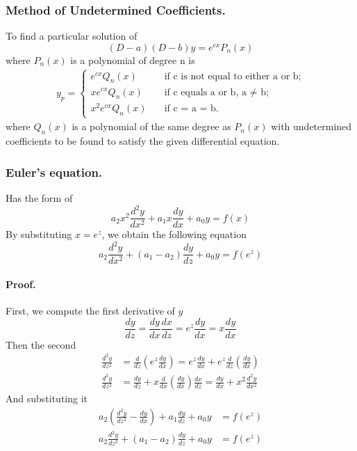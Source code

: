 \documentclass[../main.tex]{subfiles}
\begin{document}
\subsubsection*{Method of Undetermined Coefficients.} To find a particular solution of
\begin{equation*}
    (D - a)(D - b)y=e^{cx}P_n(x)
\end{equation*}
where $P_n(x)$ is a polynomial of degree n is
\begin{align*}
    y_p=
    \begin{cases}
        e^{cx}Q_n(x) \quad    & \text{if c is not equal to either a or b;} \\
        xe^{cx}Q_n(x) \quad   & \text{if c equals a or b, a  $\neq$ b;}    \\
        x^2e^{cx}Q_n(x) \quad & \text{if c = a = b.}
    \end{cases}
\end{align*}
where $Q_n(x)$ is a polynomial of the same degree as $P_n(x)$ with undetermined
coefficients to be found to satisfy the given differential equation.

\subsubsection*{Euler's equation.} Has the form of
\begin{equation*}
    a_2x^2\frac{d^2y}{dx^2} +a_1x\frac{dy}{dx} +a_0y=f(x)
\end{equation*}
By substituting $x=e^z$, we obtain the following equation
\begin{equation*}
    a_2\frac{d^2y}{dx^2} +(a_1-a_2)\frac{dy}{dz} +a_0y=f(e^z)
\end{equation*}

\paragraph*{Proof.} First, we compute the first derivative of $y$
\begin{equation*}
    \frac{dy}{dz}=\frac{dy}{dx}\frac{dx}{dz}=e^z\frac{dy}{dx}=x\frac{dy}{dx}
\end{equation*}
Then the second
\begin{align*}
    \frac{d^2y}{dz^2} & =\frac{d}{dz}\left(e^z\frac{dy}{dx}\right)=e^z\frac{dy}{dx} + e^z\frac{d}{dz}\left(\frac{dy}{dx}\right) \\
    \frac{d^2y}{dz^2} & =\frac{dy}{dz}+x\frac{d}{dx}\left(\frac{dy}{dx}\right)\frac{dx}{dz}=\frac{dy}{dx}+x^2\frac{d^2y}{dx^2}
\end{align*}
And substituting it
\begin{align*}
    a_2 \left(\frac{d^2y}{dz^2}-\frac{dy}{dx}\right)+ a_1\frac{dy}{dz} +a_0y & =f(e^z) \\
    a_2\frac{d^2y}{dz^2}+ (a_1-a_2)\frac{dy}{dz} +a_0y                       & =f(e^z)
\end{align*}
\end{document}
